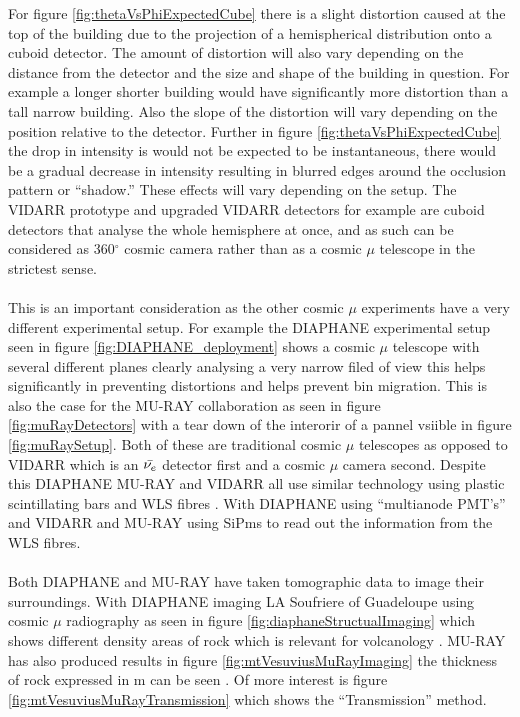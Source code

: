 For figure \ref{fig:thetaVsPhiExpectedCube} there is a slight distortion caused at the top of the building due to the projection of a hemispherical distribution onto a cuboid detector. The amount of distortion will also vary depending on the distance from the detector and the size and shape of the building in question. For example a longer shorter building would have significantly more distortion than a tall narrow building. Also the slope of the distortion will vary depending on the position relative to the detector. Further in figure \ref{fig:thetaVsPhiExpectedCube} the drop in intensity is would not be expected to be instantaneous, there would be a gradual decrease in intensity resulting in blurred edges around the occlusion pattern or ``shadow.'' These effects will vary depending on the setup. The VIDARR prototype and upgraded VIDARR detectors for example are cuboid detectors that analyse the whole hemisphere at once, and as such can be considered as 360$^\circ$ cosmic camera rather than as a cosmic $\mu$ telescope in the strictest sense. 
\\\\This is an important consideration as the other cosmic $\mu$ experiments have a very different experimental setup. For example the DIAPHANE experimental setup seen in figure \ref{fig:DIAPHANE_deployment} shows a cosmic $\mu$ telescope with several different planes clearly analysing a very narrow filed of view this helps significantly in preventing distortions and helps prevent bin migration. This is also the case for the MU-RAY collaboration as seen in figure \ref{fig:muRayDetectors} with a tear down of the interorir of a pannel vsiible in figure \ref{fig:muRaySetup}. Both of these are traditional cosmic $\mu$ telescopes as opposed to VIDARR which is an $\Bar{\nu_e}$ detector first and a cosmic $\mu$ camera second. Despite this DIAPHANE MU-RAY and VIDARR all use similar technology using plastic scintillating bars and WLS fibres \cite{Carroll_2018} \cite{Marteau_2017} \cite{ANASTASIO2013423}. With DIAPHANE using ``multianode PMT’s''  \cite{Marteau_2017} and VIDARR and MU-RAY using SiPms \cite{Carroll_2018} \cite{ANASTASIO2013423} to read out the information from the WLS fibres. 
\\\\Both DIAPHANE and MU-RAY have taken tomographic data to image their surroundings. With DIAPHANE imaging LA Soufriere of Guadeloupe using cosmic $\mu$ radiography as seen in figure \ref{fig:diaphaneStructualImaging} which shows different density areas of rock which is relevant for volcanology \cite{Marteau_2017}. MU-RAY has also produced results in figure \ref{fig:mtVesuviusMuRayImaging} the thickness of rock expressed in m can be seen \cite{Ambrosino_2014}. Of more interest is figure \ref{fig:mtVesuviusMuRayTransmission} which shows the ``Transmission'' method.

